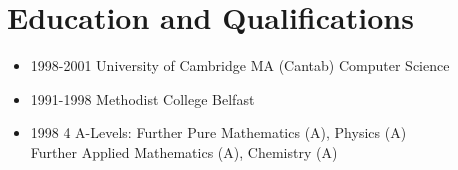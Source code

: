 \documentclass[a4paper,12pt]{article}
\begin{document}
\section*{Education and Qualifications}
\begin{itemize}
  \item 1998-2001	University of Cambridge
	  MA (Cantab) Computer Science 
  \item 1991-1998	Methodist College Belfast
  \item 1998	4 A-Levels:
	Further Pure Mathematics (A), Physics (A) \\
	Further Applied Mathematics (A), Chemistry (A)
\end{itemize}
\end{document}
